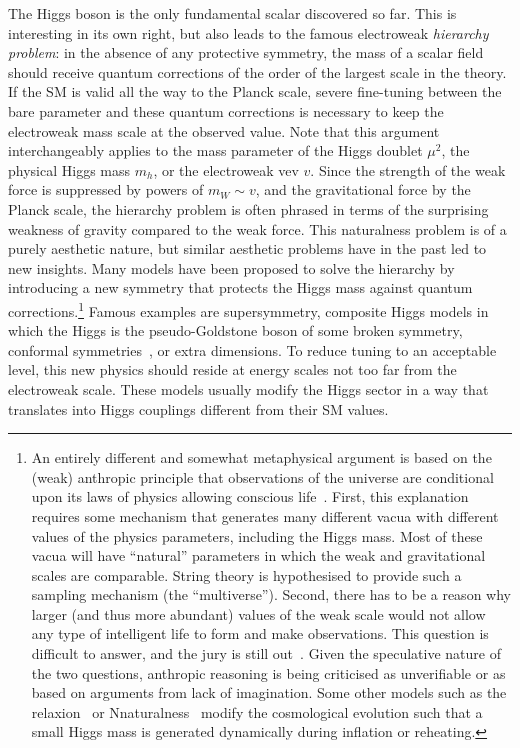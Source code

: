 The Higgs boson is the only fundamental scalar discovered so far. This
is interesting in its own right, but also leads to the famous
electroweak \emph{hierarchy problem}: in the absence of any protective
symmetry, the mass of a scalar field should receive quantum
corrections of the order of the largest scale in the theory. If the SM
is valid all the way to the Planck scale, severe fine-tuning between
the bare parameter and these quantum corrections is necessary to keep
the electroweak mass scale at the observed value. Note that this
argument interchangeably applies to the mass parameter of the Higgs
doublet $\mu^2$, the physical Higgs mass $m_h$, or the electroweak vev
$v$. Since the strength of the weak force is suppressed by powers of
$m_W \sim v$, and the gravitational force by the Planck scale, the
hierarchy problem is often phrased in terms of the surprising weakness
of gravity compared to the weak force. This naturalness problem is of
a purely aesthetic nature, but similar aesthetic problems have in the
past led to new insights. Many models have been proposed to solve the
hierarchy by introducing a new symmetry that protects the Higgs mass
against quantum corrections.\footnote{An entirely different and
  somewhat metaphysical argument is based on the (weak) anthropic
  principle that observations of the universe are conditional upon its
  laws of physics allowing conscious life~\cite{Weinberg:1987dv,
    Barrow:1988yia}. First, this explanation requires some mechanism
  that generates many different vacua with different values of the
  physics parameters, including the Higgs mass. Most of these vacua
  will have ``natural'' parameters in which the weak and gravitational
  scales are comparable. String theory is hypothesised to provide such
  a sampling mechanism (the ``multiverse''). Second, there has to be a
  reason why larger (and thus more abundant) values of the weak scale
  would not allow any type of intelligent life to form and make
  observations. This question is difficult to answer, and the jury is
  still out~\cite{Agrawal:1997gf, Harnik:2006vj, Clavelli:2006di,
    Giudice:2008bi, Donoghue:2009me, Gedalia:2010iy,
    Adams:2015hvd}. Given the speculative nature of the two questions,
  anthropic reasoning is being criticised as unverifiable or as based
  on arguments from lack of imagination. Some other models such as the
  relaxion~\cite{Graham:2015cka} or
  Nnaturalness~\cite{Arkani-Hamed:2016rle} modify the cosmological
  evolution such that a small Higgs mass is generated dynamically
  during inflation or reheating.} Famous examples are
supersymmetry, composite Higgs models in which the Higgs is the
pseudo-Goldstone boson of some broken symmetry, conformal
symmetries~\cite{Bardeen:1995kv}, or extra dimensions. To reduce
tuning to an acceptable level, this new physics should reside at
energy scales not too far from the electroweak scale. These models
usually modify the Higgs sector in a way that translates into Higgs
couplings different from their SM values.

